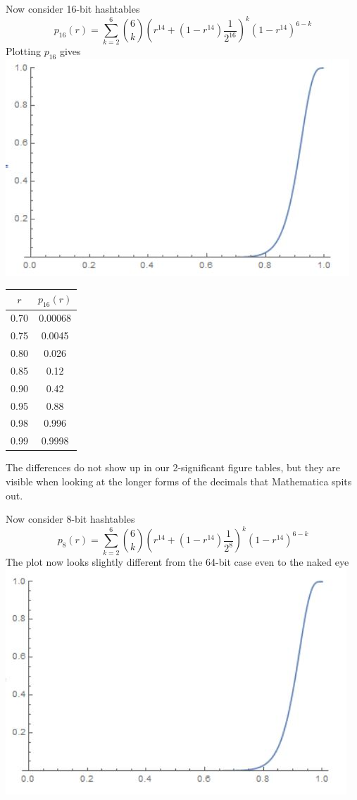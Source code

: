 \documentclass{article}
\begin{document}
Now consider 16-bit hashtables
$$p_{16}(r) = \sum\limits_{k=2}^6 {6 \choose k} (r^{14} + (1-r^{14}) \frac{1}{2^{16}})^k (1-r^{14})^{6-k}$$
Plotting $p_{16}$ gives\\
\includegraphics[scale=0.8]{p16.jpg}

\begin{center}
\begin{tabular}{ | c | c | }
\hline
$r$ & $p_{16}(r)$ \\
\hline\hline
0.70 & 0.00068 \\
\hline
0.75 & 0.0045\\
\hline
0.80 & 0.026\\
\hline
0.85 & 0.12\\
\hline
0.90 & 0.42\\
\hline
0.95 & 0.88\\
\hline
0.98 & 0.996 \\
\hline
0.99 & 0.9998 \\ 
\hline

\end{tabular}
\end{center}
The differences do not show up in our 2-significant figure tables, but they are visible when looking at the longer forms of the decimals that Mathematica spits out. 

Now consider 8-bit hashtables
$$p_{8}(r) = \sum\limits_{k=2}^6 {6 \choose k} (r^{14} + (1-r^{14}) \frac{1}{2^{8}})^k (1-r^{14})^{6-k}$$
The plot now looks slightly different from the 64-bit case even to the naked eye
\includegraphics[scale=0.8]{p8.jpg}
\end{document}
